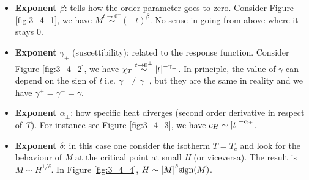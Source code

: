 \documentclass[../main/main.tex]{subfiles}
\begin{document}
\begin{bluebox}
\begin{definition}\
\begin{itemize}
\item \textbf{Exponent \( \beta \)}: tells how the order parameter goes to zero.
Consider Figure \ref{fig:3_4_1}, we have \( M \overset{t \rightarrow  0^-}{\sim} (-t)^{\beta }  \). No sense in going from above where it stays 0.

\item \textbf{Exponent \( \gamma _{\pm}  \)} (suscettibility): related to the response function. Consider Figure \ref{fig:3_4_2}, we have \( \chi _T \overset{t \rightarrow 0^{\pm}}{\sim} \abs{t}^{-\gamma _{\pm} }   \). In principle, the value of \( \gamma   \) can depend on the sign of \emph{t} i.e.   \( \gamma ^+ \neq \gamma ^-  \), but they are the same in reality and we have \( \gamma ^+ = \gamma ^- = \gamma     \).

\item \textbf{Exponent \( \alpha _{\pm} \)}: how specific heat diverges (second order derivative in respect of \emph{T}). For instance see Figure \ref{fig:3_4_3}, we have \( c_H \sim \abs{t}^{-\alpha _{\pm}}  \).

\item \textbf{Exponent \( \delta   \)}: in this case one consider the isotherm \( T =T_c \) and look for the behaviour of \emph{M} at the critical point at small \emph{H} (or viceversa).  The result is \( M \sim H^{1/\delta } \).
In Figure \ref{fig:3_4_4}, \( H \sim \abs{M}^{\delta } \text{sign} (M)  \).

\end{itemize}
\end{definition}
\end{bluebox}
\end{document}

